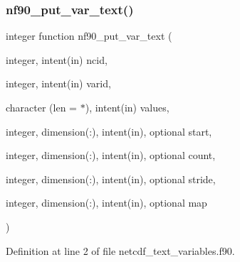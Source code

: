 \subsubsection{\texorpdfstring{nf90\+\_\+put\+\_\+var\+\_\+text()}{nf90\_put\_var\_text()}}
{\footnotesize\ttfamily integer function nf90\+\_\+put\+\_\+var\+\_\+text (\begin{DoxyParamCaption}\item[{integer, intent(in)}]{ncid,  }\item[{integer, intent(in)}]{varid,  }\item[{character (len = $\ast$), intent(in)}]{values,  }\item[{integer, dimension(\+:), intent(in), optional}]{start,  }\item[{integer, dimension(\+:), intent(in), optional}]{count,  }\item[{integer, dimension(\+:), intent(in), optional}]{stride,  }\item[{integer, dimension(\+:), intent(in), optional}]{map }\end{DoxyParamCaption})}



Definition at line 2 of file netcdf\+\_\+text\+\_\+variables.\+f90.

